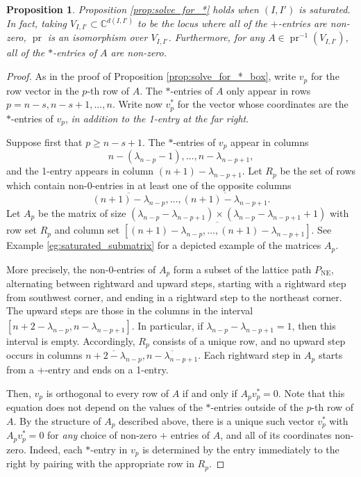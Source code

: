 \documentclass[12pt]{amsart}
\newtheorem{proposition}[definition]{Proposition}
\DeclareMathOperator{\NE}{NE}
\DeclareMathOperator{\pr}{pr}
\newcommand{\bC}{\mathbb{C}}
\begin{document}
\begin{proposition}\label{prop:solve_for_*_saturated}
    Proposition \ref{prop:solve_for_*} holds when $(I,I')$ is saturated. In fact, taking $V_{I,I'}\subset\bC^{d(I,I')}$ to be the locus where all of the $+$-entries are non-zero, $\pr$ is an isomorphism over $V_{I,I'}$. Furthermore, for any $A\in\pr^{-1}(V_{I,I'})$, all of the $*$-entries of $A$ are non-zero. 
\end{proposition}

\begin{proof}
As in the proof of Proposition \ref{prop:solve_for_*_box}, write $v_p$ for the row vector in the $p$-th row of $A$. The $*$-entries of $A$ only appear in rows $p=n-s,n-s+1,\ldots,n$. Write now $v_p^{*}$ for the vector whose coordinates are the $*$-entries of $v_p$, \emph{in addition to the 1-entry at the far right}.

Suppose first that $p\ge n-s+1$. The $*$-entries of $v_p$ appear in columns 
\begin{equation*}
    n-(\lambda_{n-p}-1),\ldots,n-\lambda_{n-p+1},
\end{equation*}
 and the 1-entry appears in column $(n+1)-\lambda_{n-p+1}$. Let $R_p$ be the set of rows which contain non-0-entries in at least one of the opposite columns
\begin{equation*}
    \overline{(n+1)-\lambda_{n-p}},\ldots,\overline{(n+1)-\lambda_{n-p+1}}.
\end{equation*}
Let $A_p$ be the matrix of size $(\lambda_{n-p}-\lambda_{n-p+1})\times (\lambda_{n-p}-\lambda_{n-p+1}+1)$ with row set $R_p$ and column set $\overline{[(n+1)-\lambda_{n-p},\ldots,(n+1)-\lambda_{n-p+1}]}$. See Example \ref{eg:saturated_submatrix} for a depicted example of the matrices $A_p$.

More precisely, the non-0-entries of $A_p$ form a subset of the lattice path $P_{\NE}$, alternating between rightward and upward steps, starting with a rightward step from southwest corner, and ending in a rightward step to the northeast corner. The upward steps are those in the columns in the interval $\overline{[n+2-\lambda_{n-p},n-\lambda_{n-p+1}]}$. In particular, if $\lambda_{n-p}-\lambda_{n-p+1}=1$, then this interval is empty. Accordingly, $R_p$ consists of a unique row, and no upward step occurs in columns $\overline{n+2-\lambda_{n-p}},\overline{n-\lambda_{n-p+1}}$. Each rightward step in $A_p$ starts from a $+$-entry and ends on a 1-entry.

Then, $v_p$ is orthogonal to every row of $A$ if and only if $A_p v_p^{*}=0$. Note that this equation does not depend on the values of the $*$-entries outside of the $p$-th row of $A$. By the structure of $A_p$ described above, there is a unique such vector $v_p^{*}$ with $A_p v_p^{*}=0$ for \emph{any} choice of non-zero $+$ entries of $A$, and all of its coordinates non-zero. Indeed, each $*$-entry in $v_p$ is determined by the entry immediately to the right by pairing with the appropriate row in $R_p$.


\end{proof}
\end{document}
